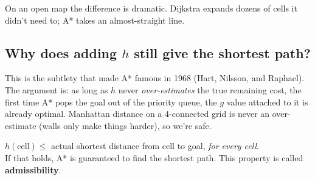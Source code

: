\documentclass[11pt,a4paper]{article}
\newcommand{\gridbase}[2]{%
  \draw[step=0.6,gray!50,very thin] (0,0) grid (#1*0.6,#2*0.6);
  \draw[black,thick] (0,0) rectangle (#1*0.6,#2*0.6);
}
\newcommand{\fillcell}[3]{%
  \fill[#3] (#1*0.6,#2*0.6) rectangle ({(#1+1)*0.6},{(#2+1)*0.6});
  \draw[gray!50,very thin] (#1*0.6,#2*0.6) rectangle ({(#1+1)*0.6},{(#2+1)*0.6});
}
\newcommand{\celltext}[3]{%
  \node at ({(#1+0.5)*0.6},{(#2+0.5)*0.6}) {\footnotesize #3};
}
\begin{document}
\begin{center}
\end{center}

\noindent On an open map the difference is dramatic. Dijkstra expands dozens of cells it didn't need to; A* takes an almost-straight line.

\subsection{Why does adding $h$ still give the shortest path?}

This is the subtlety that made A* famous in 1968 (Hart, Nilsson, and Raphael). The argument is: as long as $h$ never \emph{over-estimates} the true remaining cost, the first time A* pops the goal out of the priority queue, the $g$ value attached to it is already optimal. Manhattan distance on a 4-connected grid is never an over-estimate (walls only make things harder), so we're safe.

\begin{keybox}
$h(\text{cell}) \le$ actual shortest distance from cell to goal, \textit{for every cell}.\\
If that holds, A* is guaranteed to find the shortest path. This property is called \textbf{admissibility}.
\end{keybox}
\end{document}
